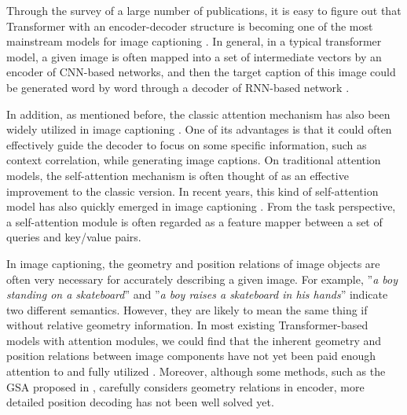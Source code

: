 \documentclass[review]{elsarticle}
\begin{document}
Through the survey of a large number of publications, it is easy to figure out that Transformer with an encoder-decoder structure is becoming one of the most mainstream models for image captioning \cite{guo2020normalized}. In general, in a typical transformer model, a given image is often mapped into a set of intermediate vectors by an encoder of CNN-based networks, and then the target caption of this image could be generated word by word through a decoder of RNN-based network \cite{Anderson_2018_CVPR,karpathy2015deep,vinyals2015show,Lu_2017_CVPR}.

%

In addition, as mentioned before, the classic attention mechanism has also been widely utilized in image captioning \cite{Youquanzeng2016,huang2019attention}. One of its advantages is that it could often effectively guide the decoder to focus on some specific information, such as context correlation, while generating image captions. On traditional attention models, the self-attention mechanism \cite{vaswani2017attention} is often thought of as an effective improvement to the classic version. In recent years, this kind of self-attention model has also quickly emerged in image captioning \cite{herdade2019image,li2019entangled}. From the task perspective, a self-attention module is often regarded as a feature mapper between a set of queries and key/value pairs.

In image captioning, the geometry and position relations of image objects are often very necessary for accurately describing a given image. For example, ''\emph{a boy standing on a skateboard}'' and ''\emph{a boy raises a skateboard in his hands}'' indicate two different semantics. However, they are likely to mean the same thing if without relative geometry information. In most existing Transformer-based models with attention modules, we could find that the inherent geometry and position relations between image components have not yet been paid enough attention to and fully utilized \cite{Lu_2017_CVPR}. Moreover, although some methods, such as the GSA proposed in \cite{guo2020normalized}, carefully considers geometry relations in encoder, more detailed position decoding has not been well solved yet.
\end{document}
